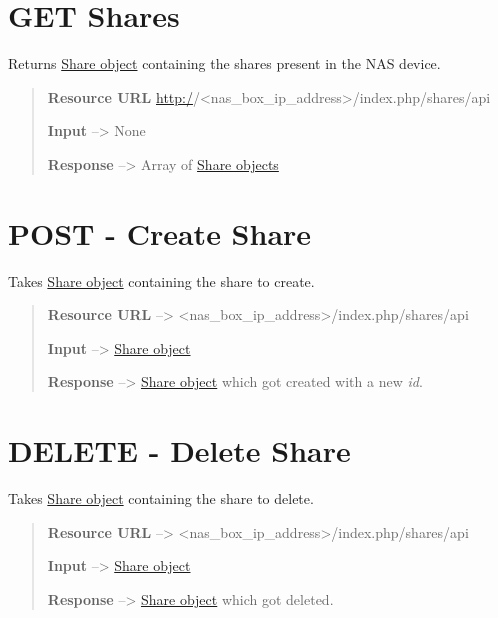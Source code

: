 \documentclass[letterpaper,10pt,english]{sphinxmanual}
\begin{document}
\section{GET Shares}
\label{shares:get-shares}
Returns {\hyperref[shares:share-object-label]{Share object}} containing the shares present
in the NAS device.
\begin{quote}

\textbf{Resource URL} \href{http:/}{http:/}/\textless{}nas\_box\_ip\_address\textgreater{}/index.php/shares/api

\textbf{Input} --\textgreater{} None

\textbf{Response} --\textgreater{} Array of {\hyperref[shares:share-object-label]{Share objects}}
\end{quote}


\section{POST - Create Share}
\label{shares:post-create-share}
Takes {\hyperref[shares:share-object-label]{Share object}} containing the share to create.
\begin{quote}

\textbf{Resource URL} --\textgreater{} \textless{}nas\_box\_ip\_address\textgreater{}/index.php/shares/api

\textbf{Input} --\textgreater{} {\hyperref[shares:share-object-label]{Share object}}

\textbf{Response} --\textgreater{} {\hyperref[shares:share-object-label]{Share object}} which got created with a new \emph{id}.
\end{quote}


\section{DELETE - Delete Share}
\label{shares:delete-delete-share}
Takes {\hyperref[shares:share-object-label]{Share object}} containing the share to delete.
\begin{quote}

\textbf{Resource URL} --\textgreater{} \textless{}nas\_box\_ip\_address\textgreater{}/index.php/shares/api

\textbf{Input} --\textgreater{} {\hyperref[shares:share-object-label]{Share object}}

\textbf{Response} --\textgreater{} {\hyperref[shares:share-object-label]{Share object}} which got deleted.
\end{quote}
\end{document}
